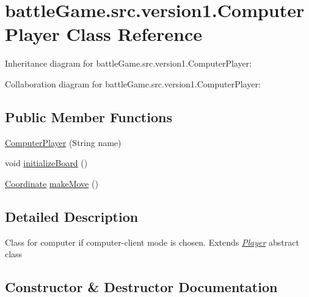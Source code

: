 \hypertarget{classbattleGame_1_1src_1_1version1_1_1ComputerPlayer}{}\section{battle\+Game.\+src.\+version1.\+Computer\+Player Class Reference}
\label{classbattleGame_1_1src_1_1version1_1_1ComputerPlayer}


Inheritance diagram for battle\+Game.\+src.\+version1.\+Computer\+Player\+:


Collaboration diagram for battle\+Game.\+src.\+version1.\+Computer\+Player\+:
\subsection*{Public Member Functions}
\begin{DoxyCompactItemize}
\item 
\hyperlink{classbattleGame_1_1src_1_1version1_1_1ComputerPlayer_a41274f4d8e238019f15943dc773966f2}{Computer\+Player} (String name)
\item 
void \hyperlink{classbattleGame_1_1src_1_1version1_1_1ComputerPlayer_a7cb4b081f38a0b035393726b5bb17120}{initialize\+Board} ()
\item 
\hyperlink{classbattleGame_1_1src_1_1version1_1_1Coordinate}{Coordinate} \hyperlink{classbattleGame_1_1src_1_1version1_1_1ComputerPlayer_a216f60d136ae10020dcc873c4bc79bfe}{make\+Move} ()
\end{DoxyCompactItemize}


\subsection{Detailed Description}
Class for computer if computer-\/client mode is chosen. Extends {\itshape \hyperlink{classbattleGame_1_1src_1_1version1_1_1Player}{Player}} abstract class 

\subsection{Constructor \& Destructor Documentation}
